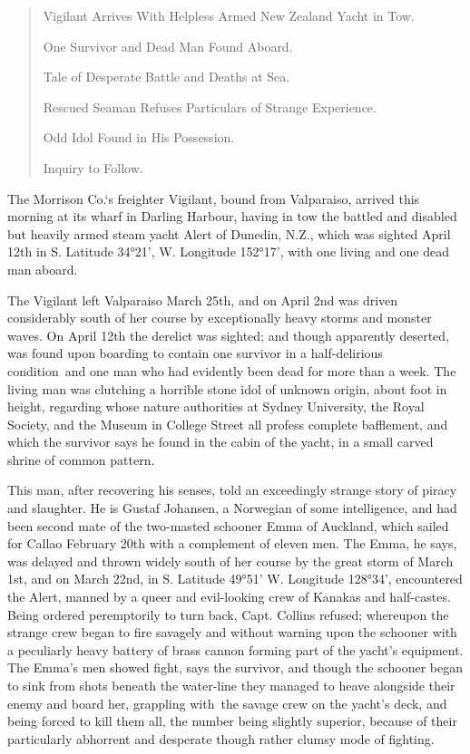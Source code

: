 \begin{quote}

Vigilant Arrives With Helpless Armed New Zealand Yacht in Tow.

One Survivor and Dead Man Found Aboard.

Tale of Desperate Battle and Deaths at Sea.

Rescued Seaman Refuses Particulars of Strange Experience.

Odd Idol Found in His Possession.

Inquiry to Follow.
\end{quote}


The Morrison Co.`s freighter Vigilant, bound from Valparaiso, arrived
this morning at its wharf in Darling Harbour, having in tow the battled
and disabled but heavily armed steam yacht Alert of Dunedin, N.Z., which
was sighted April 12th in S. Latitude 34°21', W. Longitude 152°17', with
one living and one dead man aboard.

The Vigilant left Valparaiso March 25th, and on April 2nd was driven
considerably south of her course by exceptionally heavy storms and
monster waves. On April 12th the derelict was sighted; and though
apparently deserted, was found upon boarding to contain one survivor in
a half-delirious condition\est\ and one man who had evidently been dead for
more than a week. The living man was clutching a horrible stone idol of
unknown origin, about foot in height, regarding whose nature authorities
at Sydney University, the Royal Society, and the Museum in College
Street all profess complete bafflement, and which the survivor says he
found in the cabin of the yacht, in a small carved shrine of common
pattern.

This man, after recovering his senses, told an exceedingly strange story
of piracy and slaughter. He is Gustaf Johansen, a Norwegian of some
intelligence, and had been second mate of the two-masted schooner Emma
of Auckland, which sailed for Callao February 20th with a complement of
eleven men. The Emma, he says, was delayed and thrown widely south of
her course by the great storm of March 1st, and on March 22nd, in S.
Latitude 49°51' W. Longitude 128°34', encountered the Alert, manned by a
queer and evil-looking crew of Kanakas and half-castes. Being ordered
peremptorily to turn back, Capt. Collins refused; whereupon the strange
crew began to fire savagely and without warning upon the schooner with a
peculiarly heavy battery of brass cannon forming part of the yacht's
equipment. The Emma's men showed fight, says the survivor, and though
the schooner began to sink from shots beneath the water-line they
managed to heave alongside their enemy and board her, grappling with\est\ the
 savage crew on the yacht's deck, and being forced to kill them all, the
number being slightly superior, because of their particularly abhorrent
and desperate though rather clumsy mode of fighting.

